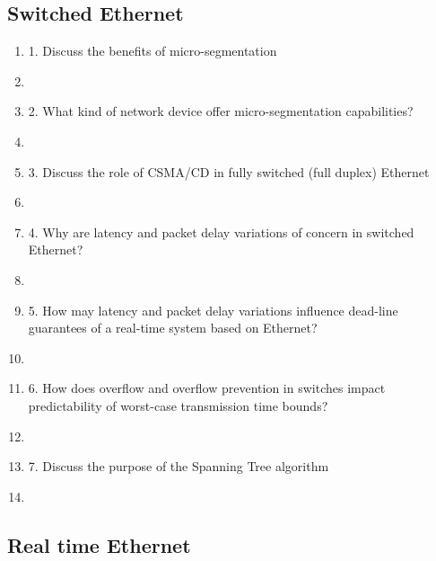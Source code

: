 \documentclass[oneside, 10pt]{article}
\begin{document}
\subsection{Switched Ethernet}
\begin{enumerate}
	\item 1. Discuss the benefits of micro-segmentation
	\item[]
	
	\item 2. What kind of network device offer micro-segmentation capabilities?
	\item[]
	
	\item 3. Discuss the role of CSMA/CD in fully switched (full duplex) Ethernet
	\item[]
	
	\item 4. Why are latency and packet delay variations of concern in switched Ethernet?
	\item[]

	\item 5. How may latency and packet delay variations influence dead-line guarantees of a real-time system based on Ethernet?
	\item[]
	
	\item 6. How does overflow and overflow prevention in switches impact predictability of worst-case transmission time bounds?
	\item[]
	
	\item 7. Discuss the purpose of the Spanning Tree algorithm
	\item[]
	
\end{enumerate}

\subsection{Real time Ethernet}
\end{document}
